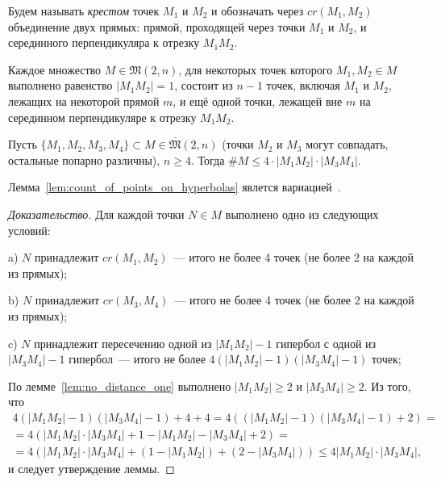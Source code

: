 \documentclass[11pt,twoside,draft
]{article}
\begin{document}
\begin{definition}
	\cite[определение 2.5]{my-pps-linear-bound-2019}
	Будем называть \textit{крестом} точек $M_1$ и $M_2$ и обозначать через $cr(M_1,M_2)$ объединение двух прямых:
	прямой, проходящей через точки $M_1$ и $M_2$,
	и серединного перпендикуляра к отрезку $M_1 M_2$.
\end{definition}

\begin{lemm}
	\cite[теорема 3.10]{my-pps-linear-bound-2019}
	\label{lem:no_distance_one}
	Каждое множество $M\in\mathfrak{M}(2,n)$,
	для некоторых точек которого $M_1,M_2 \in M$ выполнено равенство $|M_1 M_2|=1$,
	состоит из $n-1$ точек, включая $M_1$ и $M_2$, лежащих на некоторой прямой $m$,
	и ещё одной точки, лежащей вне $m$ на серединном перпендикуляре к отрезку $M_1 M_2$.
\end{lemm}


\begin{lemm}
	\label{lem:count_of_points_on_hyperbolas}
	Пусть $\{M_1, M_2, M_3, M_4\} \subset M\in\overline{\mathfrak{M}}(2,n)$
	(точки $M_2$ и $M_3$ могут совпадать, остальные попарно различны), $n\geq 4$.
	Тогда $\# M \leq 4 \cdot |M_1 M_2| \cdot |M_3 M_4|$.
\end{lemm}

\begin{remark}
	Лемма~\ref{lem:count_of_points_on_hyperbolas} явлется вариацией~\cite{erdos1945integral}.
\end{remark}

\begin{proof}[Доказательство]
	Для каждой точки $N\in M$ выполнено одно из следующих условий:

	a) $N$ принадлежит $cr(M_1,M_2)$~--- итого не более 4 точек (не более 2 на каждой из прямых);

	b) $N$ принадлежит $cr(M_3,M_4)$~--- итого не более 4 точек (не более 2 на каждой из прямых);

	c) $N$ принадлежит пересечению одной из $|M_1 M_2| - 1$ гипербол
	с одной из $|M_3 M_4| - 1$ гипербол~--- итого не более  $4 (|M_1 M_2| - 1)(|M_3 M_4| - 1)$ точек;

	По лемме~\ref{lem:no_distance_one} выполнено $|M_1 M_2| \geq 2$ и $|M_3 M_4| \geq 2$.
	Из того, что
	\begin{multline}
		4 (|M_1 M_2| - 1)(|M_3 M_4| - 1) + 4 + 4
		=
		4 ( (|M_1 M_2| - 1)(|M_3 M_4| - 1) + 2)
		=
		\\=
		4 ( |M_1 M_2| \cdot |M_3 M_4| + 1 - |M_1 M_2| - |M_3 M_4| + 2)
		=
		\\=
		4 ( |M_1 M_2| \cdot |M_3 M_4| + (1 - |M_1 M_2|) + (2 - |M_3 M_4|))
		\leq
		4 |M_1 M_2| \cdot |M_3 M_4|
		,
	\end{multline}
	и следует утверждение леммы.
\end{proof}
\end{document}
